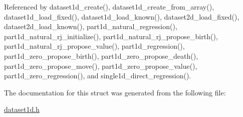 Referenced by dataset1d\+\_\+create(), dataset1d\+\_\+create\+\_\+from\+\_\+array(), dataset1d\+\_\+load\+\_\+fixed(), dataset1d\+\_\+load\+\_\+known(), dataset2d\+\_\+load\+\_\+fixed(), dataset2d\+\_\+load\+\_\+known(), part1d\+\_\+natural\+\_\+regression(), part1d\+\_\+natural\+\_\+rj\+\_\+initialize(), part1d\+\_\+natural\+\_\+rj\+\_\+propose\+\_\+birth(), part1d\+\_\+natural\+\_\+rj\+\_\+propose\+\_\+value(), part1d\+\_\+regression(), part1d\+\_\+zero\+\_\+propose\+\_\+birth(), part1d\+\_\+zero\+\_\+propose\+\_\+death(), part1d\+\_\+zero\+\_\+propose\+\_\+move(), part1d\+\_\+zero\+\_\+propose\+\_\+value(), part1d\+\_\+zero\+\_\+regression(), and single1d\+\_\+direct\+\_\+regression().



The documentation for this struct was generated from the following file\+:\begin{DoxyCompactItemize}
\item 
\hyperlink{dataset1d_8h}{dataset1d.\+h}\end{DoxyCompactItemize}
